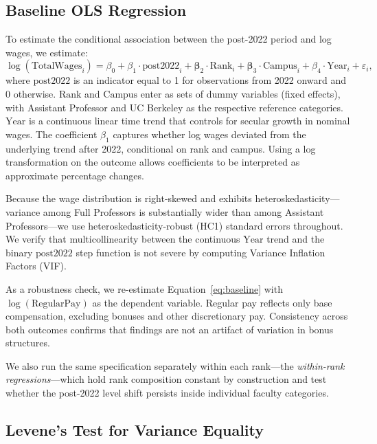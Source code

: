\documentclass[12pt]{article}
\begin{document}
\subsection{Baseline OLS Regression}

To estimate the conditional association between the post-2022 period and
log wages, we estimate:
\begin{equation}
  \log(\text{TotalWages}_{i}) =
    \beta_0 + \beta_1 \cdot \text{post2022}_{i}
    + \mathbf{\beta}_2 \cdot \text{Rank}_i
    + \mathbf{\beta}_3 \cdot \text{Campus}_i
    + \beta_4 \cdot \text{Year}_i + \varepsilon_i,
  \label{eq:baseline}
\end{equation}
where $\text{post2022}$ is an indicator equal to 1 for observations from
2022 onward and 0 otherwise. $\text{Rank}$ and $\text{Campus}$ enter as
sets of dummy variables (fixed effects), with Assistant Professor and UC
Berkeley as the respective reference categories. $\text{Year}$ is a
continuous linear time trend that controls for secular growth in nominal
wages. The coefficient $\beta_1$ captures whether log wages deviated
from the underlying trend after 2022, conditional on rank and campus.
Using a log transformation on the outcome allows coefficients to be
interpreted as approximate percentage changes.

Because the wage distribution is right-skewed and exhibits
heteroskedasticity---variance among Full Professors is substantially
wider than among Assistant Professors---we use heteroskedasticity-robust
(HC1) standard errors throughout. We verify that multicollinearity
between the continuous $\text{Year}$ trend and the binary
$\text{post2022}$ step function is not severe by computing Variance
Inflation Factors (VIF).

As a robustness check, we re-estimate Equation~\eqref{eq:baseline} with
$\log(\text{RegularPay})$ as the dependent variable. Regular pay reflects
only base compensation, excluding bonuses and other discretionary pay.
Consistency across both outcomes confirms that findings are not an
artifact of variation in bonus structures.

We also run the same specification separately within each rank---the
\textit{within-rank regressions}---which hold rank composition constant
by construction and test whether the post-2022 level shift persists
inside individual faculty categories.

\subsection{Levene's Test for Variance Equality}
\end{document}
